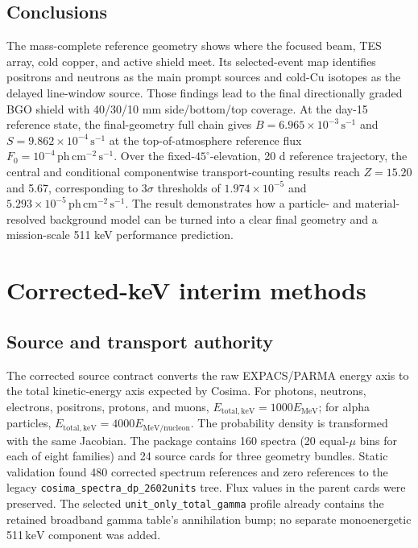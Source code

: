 \documentclass[11pt]{article}
\newcommand{\keV}{\ensuremath{\,\mathrm{keV}}}
\newcommand{\phcms}{\ensuremath{\,\mathrm{ph\,cm^{-2}\,s^{-1}}}}
\newcommand{\cps}{\ensuremath{\,\mathrm{s^{-1}}}}
\newcommand{\fzero}{F_{0}}
\begin{document}
\subsection{Conclusions}
\label{sec:conclusions}

The mass-complete reference geometry shows where the focused beam, TES array,
cold copper, and active shield meet. Its selected-event map identifies positrons and
neutrons as the main prompt sources and cold-Cu isotopes as the delayed line-window
source. Those findings lead to the final directionally graded BGO shield with
40/30/10 mm side/bottom/top coverage. At the day-15 reference state, the
final-geometry full chain gives
$B=6.965\times10^{-3}\cps$ and $S=9.862\times10^{-4}\cps$ at the
top-of-atmosphere reference flux $\fzero=10^{-4}\phcms$. Over the fixed-$45^\circ$-elevation,
20 d reference trajectory, the central and conditional componentwise
transport-counting results reach $Z=15.20$ and 5.67, corresponding to
$3\sigma$ thresholds of $1.974\times10^{-5}$ and
$5.293\times10^{-5}\phcms$. The result demonstrates how a particle- and
material-resolved background model can be turned into a clear final geometry and
a mission-scale 511 keV performance prediction.

\fi

\section{Corrected-keV interim methods}
\label{sec:framework}

\subsection{Source and transport authority}
\label{subsec:prompt_source}

The corrected source contract converts the raw EXPACS/PARMA energy axis to the
total kinetic-energy axis expected by Cosima. For photons, neutrons, electrons,
positrons, protons, and muons,
$E_{\mathrm{total,keV}}=1000E_{\mathrm{MeV}}$; for alpha particles,
$E_{\mathrm{total,keV}}=4000E_{\mathrm{MeV/nucleon}}$. The probability
density is transformed with the same Jacobian. The package contains 160 spectra
(20 equal-$\mu$ bins for each of eight families) and 24 source cards for three
geometry bundles. Static validation found 480 corrected spectrum references and
zero references to the legacy \texttt{cosima\_spectra\_dp\_2602units} tree. Flux
values in the parent cards were preserved. The selected
\texttt{unit\_only\_total\_gamma} profile already contains the retained
broadband gamma table's annihilation bump; no separate monoenergetic 511\keV{}
component was added.
\end{document}
